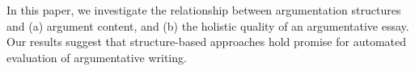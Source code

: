 In this paper, we investigate the relationship between argumentation structures and (a) argument content, and (b) the holistic quality of an argumentative essay. Our results suggest that structure-based approaches hold promise for automated  evaluation of argumentative writing.
